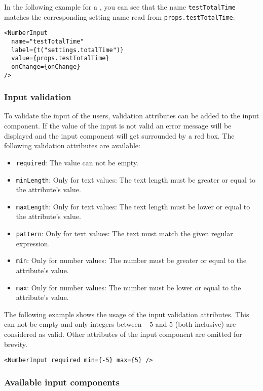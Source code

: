 In the following example for a , you can see that the name \texttt{testTotalTime} matches the corresponding setting name read from \texttt{props.testTotalTime}:
\begin{verbatim}
<NumberInput
  name="testTotalTime"
  label={t("settings.totalTime")}
  value={props.testTotalTime}
  onChange={onChange}
/> 
\end{verbatim}

\subsubsection*{Input validation}
To validate the input of the users, validation attributes can be added to the input component. 
If the value of the input is not valid an error message will be displayed and the input component will get surrounded by a red box. 
The following validation attributes are available:
\begin{itemize}
  \item \texttt{required}: The value can not be empty.
  \item \texttt{minLength}: Only for text values: The text length must be greater or equal to the attribute's value.
  \item \texttt{maxLength}: Only for text values: The text length must be lower or equal to the attribute's value.
  \item \texttt{pattern}: Only for text values: The text must match the given regular expression.
  \item \texttt{min}: Only for number values: The number must be greater or equal to the attribute's value.
  \item \texttt{max}: Only for number values: The number must be lower or equal to the attribute's value.
\end{itemize}

The following example shows the usage of the input validation attributes. 
This  can not be empty and only integers between $-5$ and $5$ (both inclusive) are considered as valid.
Other attributes of the input component are omitted for brevity.
\begin{verbatim}
<NumberInput required min={-5} max={5} />
\end{verbatim}

\subsubsection*{Available input components}
